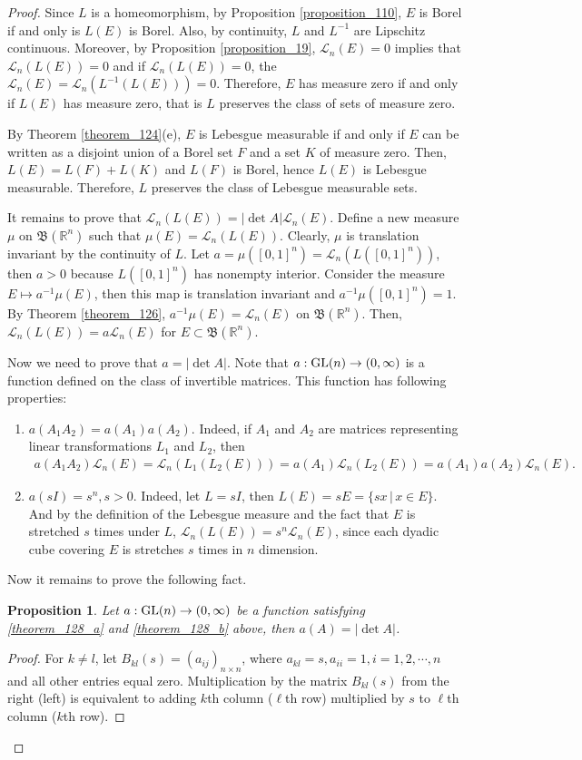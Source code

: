 \documentclass[11pt]{book}
\newtheorem{proposition}{Proposition}[chapter]
\theoremstyle{definition}
\numberwithin{equation}{chapter}
\def\BB{\mathfrak{B}}
\def\L{{\mathcal L}}
\begin{document}
\begin{proof}
Since $L$ is a homeomorphism, by Proposition \ref{proposition_110}, $E$ is Borel if and only is $L(E)$ is Borel. Also, by continuity, $L$ and $L^{-1}$ are Lipschitz continuous. Moreover, by Proposition \ref{proposition_19}, $\L_n(E) = 0$ implies that $\L_n(L(E)) = 0$ and if $\L_n(L(E)) = 0$, the $\L_n(E) = \L_n(L^{-1}(L(E))) = 0$. Therefore, $E$ has measure zero if and only if $L(E)$ has measure zero, that is $L$ preserves the class of sets of measure zero.

By Theorem \ref{theorem_124}(e), $E$ is Lebesgue measurable if and only if $E$ can be written as a disjoint union of a Borel set $F$ and a set $K$ of measure zero. Then, $L(E) = L(F) + L(K)$ and $L(F)$ is Borel, hence $L(E)$ is Lebesgue measurable. Therefore, $L$ preserves the class of Lebesgue measurable sets.

It remains to prove that $\L_n(L(E)) = \left|\det A\right| \L_n(E)$. Define a new measure $\mu$ on $\BB(\mathbb{R}^n)$ such that $\mu(E)= \L_n(L(E))$. Clearly, $\mu$ is translation invariant by the continuity of $L$. Let $a = \mu([0,1]^n) = \L_n(L([0,1]^n))$, then $a > 0$ because $L([0,1]^n)$ has nonempty interior. Consider the measure $E \mapsto a^{-1} \mu(E)$, then this map is translation invariant and $a^{-1} \mu([0,1]^n) = 1$. By Theorem \ref{theorem_126}, $a^{-1} \mu(E) = \L_n(E)$ on $\BB(\mathbb{R}^n)$. Then, $\L_n(L(E)) = a \L_n(E)$ for $E \subset \BB(\mathbb{R}^n)$. 

Now we need to prove that $a = \left|\det A\right|$. Note that $a:{\rm GL}(n) \to (0,\infty)$ is a function defined on the class of invertible matrices. This function has following properties:
\begin{enumerate}[label=(\alph*)]
    \item\label{theorem_128_a} $a(A_1A_2) = a(A_1)a(A_2)$. Indeed, if $A_1$ and $A_2$ are matrices representing linear transformations $L_1$ and $L_2$, then
    \begin{align*}
        a(A_1A_2)\L_n(E) = \L_n(L_1(L_2(E))) = a(A_1) \L_n(L_2(E)) = a(A_1) a(A_2) \L_n(E).
    \end{align*}
    \item $a(sI) = s^n, s > 0$. Indeed, let $L = sI$, then $L(E) = sE = \{sx\,|\,x\in E\}$. And by the definition of the Lebesgue measure and the fact that $E$ is stretched $s$ times under $L$, $\L_n(L(E)) = s^n \L_n(E)$, since each dyadic cube covering $E$ is stretches $s$ times in $n$ dimension.\label{theorem_128_b}
\end{enumerate}
Now it remains to prove the following fact.
\begin{proposition}
Let $a:{\rm GL}(n) \to (0,\infty)$ be a function satisfying \ref{theorem_128_a} and \ref{theorem_128_b} above, then $a(A) = \left|\det A\right|$.
\end{proposition}
\begin{proof}
For $k \neq l$, let $B_{kl}(s) = (a_{ij})_{n\times n}$, where $a_{kl} = s, a_{ii} = 1, i = 1,2,\cdots,n$ and all other entries equal zero. Multiplication by the matrix $B_{kl}(s)$ from the right (left) is equivalent to adding $k$th column ($\ell$th row) multiplied by $s$ to $\ell$th column ($k$th row).


\end{proof}
\end{proof}
\end{document}
